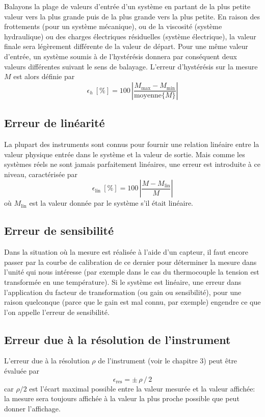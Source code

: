 Balayons la plage de valeurs d'entrée d'un système en partant de la plus petite valeur vers la plus grande puis de la plus grande vers la plus petite. En raison des frottements (pour un système mécanique), ou de la viscosité (système hydraulique) ou des charges électriques résiduelles (système électrique), la valeur finale sera légèrement différente de la valeur de départ. Pour une même valeur d'entrée, un système soumis à de l'hystérésis donnera par conséquent deux valeurs différentes suivant le sens de balayage. L'erreur d'hystérésis sur la mesure $M$ est alors définie par
$$
    \epsilon_h\ [\%]=100\,\left|\frac{M_{\text{max}}-M_{\text{min}}}{\text{moyenne}\{M\}}\right|
$$

\subsection{Erreur de linéarité}

La plupart des instruments sont connus pour fournir une relation linéaire entre la valeur physique entrée dans le système et la valeur de sortie. Mais comme les systèmes réels ne sont jamais parfaitement linéaires, une erreur est introduite à ce niveau, caractérisée par
$$
    \epsilon_\text{lin}\ [\%]=100\,\left|\frac{M-M_{\text{lin}}}{M}\right|
$$
où $M_{\text{lin}}$ est la valeur donnée par le système s'il était linéaire.

\subsection{Erreur de sensibilité}

Dans la situation où la mesure est réalisée à l'aide d'un capteur, il faut encore passer par la courbe de calibration de ce dernier pour déterminer la mesure dans l'unité qui nous intéresse (par exemple dans le cas du thermocouple la tension est transformée en une température). Si le système est linéaire, une erreur dans l'application du facteur de transformation (ou gain ou sensibilité), pour une raison quelconque (parce que le gain est mal connu, par exemple) engendre ce que l'on appelle l'erreur de sensibilité.

\subsection{Erreur due à la résolution de l'instrument}

L'erreur due à la résolution $\rho$ de l'instrument (voir le chapitre 3) peut être évaluée par
$$\epsilon_{\text{res}}=\pm\,\rho\,/\,2$$
car $\rho/2$ est l'écart maximal possible entre la valeur mesurée et la valeur affichée: la mesure sera toujours affichée à la valeur la plus proche possible que peut donner l'affichage.

